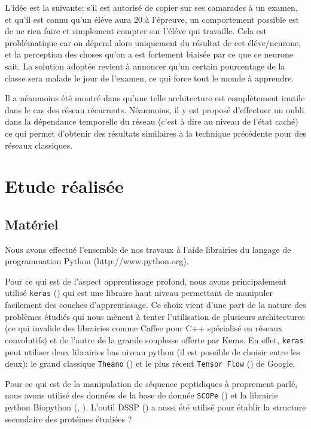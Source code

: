 \documentclass[a4paper, 11pt, onecolumn]{article}
\begin{document}
L'idée est la suivante: s'il est autorisé de copier sur ses camarades à un
examen, et qu'il est connu qu'un éléve aura 20 à l'épreuve, un comportement
possible est de ne rien faire et simplement compter sur l'éléve qui travaille.
Cela est problématique car on dépend alors uniquement du résultat de cet
éléve/neurone, et la perception des choses qu'on a est fortement biaisée par ce
que ce neurone sait. La solution adoptée revient à annoncer qu'un certain
pourcentage de la classe sera malade le jour de l'examen, ce qui force tout le
monde à apprendre.

Il a néanmoins été montré dans \cite{gal2015theoretically} qu'une telle
architecture est complètement inutile dans le cas des réseau récurrents.
Néanmoins, il y est proposé d'effectuer un oubli dans la dépendance temporelle
du réseau (c'est à dire au niveau de l'état caché) ce qui permet d'obtenir des
résultats similaires à la technique précédente pour des réseaux classiques.

\section{Etude réalisée}

\subsection{Matériel}

Nous avons effectué l'ensemble de nos travaux à l'aide librairies du langage de
programmation Python (http://www.python.org).

Pour ce qui est de l'aspect apprentissage profond, nous avons principalement
utilisé \texttt{keras} (\cite{chollet2015keras}) qui est une libraire haut niveau
permettant de manipuler facilement des couches d'apprentissage. Ce choix vient
d'une part de la nature des problèmes étudiés qui nous mènent à tenter
l'utilisation de plusieurs architectures (ce qui invalide des librairies comme
Caffee pour C++ spécialisé en réseaux convolutifs) et de l'autre de la grande
souplesse offerte par Keras. En effet, \texttt{keras} peut utiliser deux
librairies bas niveau python (il est possible de choisir entre les deux): le
grand classique \texttt{Theano} (\cite{2016arXiv160502688full}) et le plus récent
\texttt{Tensor Flow} (\cite{tensorflow2015-whitepaper}) de Google.

Pour ce qui est de la manipulation de séquence peptidiques à proprement parlé,
nous avons utilisé des données de la base de donnée \texttt{SCOPe}
(\cite{fox2014scope}) et la librairie python Biopython (\cite{Cock01062009},
\cite{hamelryck2003pdb}). L'outil DSSP (\cite{kabsch1983dictionary}) a aussi été
utilisé pour établir la structure secondaire des protéines étudiées ?
\end{document}
